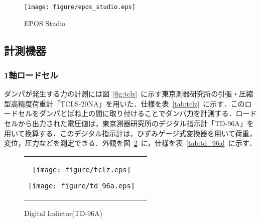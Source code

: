 \documentclass[a4paper,12pt]{article_vdlab_sotsuron}
\begin{document}
\vspace*{10mm}
\begin{figure}[htp]
  \begin{center}
    \texttt{[image: figure/epos\_studio.eps]}
    \vspace*{3mm}
    \caption{EPOS Studio}
    \label{fig:epos_studio}
  \end{center}
\end{figure}

\newpage
\subsection{計測機器}
\subsubsection{1軸ロードセル}
ダンパが発生する力の計測には図~\ref{fig:tclz}~に示す東京測器研究所の引張・圧縮型高精度荷重計「TCLS-20NA」を用いた．仕様を表~\ref{tab:tclz}~に示す．このロードセルをダンパとばね上の間に取り付けることでダンパ力を計測する．ロードセルから出力された電圧値は，東京測器研究所のデジタル指示計「TD-96A」を用いて換算する．このデジタル指示計は，ひずみゲージ式変換器を用いて荷重，変位，圧力などを測定できる．外観を図~\ref{fig:td_96a}~に，仕様を表~\ref{tab:td_96a}~に示す．

\vspace*{10mm}
\begin{figure}[h!]
  \begin{tabular}{cc}
  \begin{minipage}{0.5\hsize}
  \begin{center} 
    \texttt{[image: figure/tclz.eps]}
      \vspace*{3mm}
      \caption{Loadcell(TCLZ-20NA)}
      \label{fig:tclz}
    \end{center}
  \end{minipage}
  \begin{minipage}{0.5\hsize}
     \begin{center}
      \texttt{[image: figure/td\_96a.eps]}
      \vspace*{3mm}
      \caption{Digital Indictor(TD-96A)}
      \label{fig:td_96a}
    \end{center}
  \end{minipage}
  \end{tabular}
 \end{figure}
\end{document}
